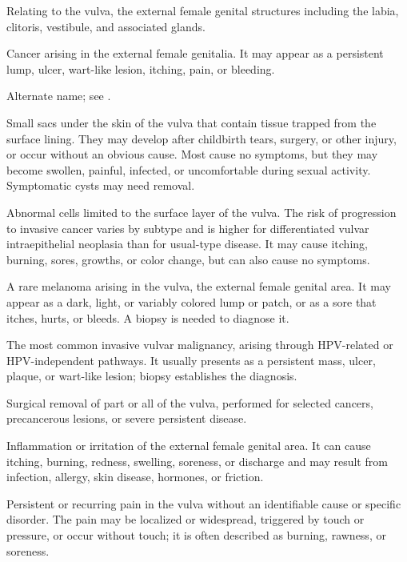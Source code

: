  Relating to the vulva, the external female genital structures including the labia, clitoris, vestibule, and associated glands.

 Cancer arising in the external female genitalia. It may appear as a persistent lump, ulcer, wart-like lesion, itching, pain, or bleeding.

 Alternate name; see .

 Small sacs under the skin of the vulva that contain tissue trapped from the surface lining. They may develop after childbirth tears, surgery, or other injury, or occur without an obvious cause. Most cause no symptoms, but they may become swollen, painful, infected, or uncomfortable during sexual activity. Symptomatic cysts may need removal.

 Abnormal cells limited to the surface layer of the vulva. The risk of progression to invasive cancer varies by subtype and is higher for differentiated vulvar intraepithelial neoplasia than for usual-type disease. It may cause itching, burning, sores, growths, or color change, but can also cause no symptoms.

 A rare melanoma arising in the vulva, the external female genital area. It may appear as a dark, light, or variably colored lump or patch, or as a sore that itches, hurts, or bleeds. A biopsy is needed to diagnose it.

 The most common invasive vulvar malignancy, arising through HPV-related or HPV-independent pathways. It usually presents as a persistent mass, ulcer, plaque, or wart-like lesion; biopsy establishes the diagnosis.

 Surgical removal of part or all of the vulva, performed for selected cancers, precancerous lesions, or severe persistent disease.

 Inflammation or irritation of the external female genital area. It can cause itching, burning, redness, swelling, soreness, or discharge and may result from infection, allergy, skin disease, hormones, or friction.

 Persistent or recurring pain in the vulva without an identifiable cause or specific disorder. The pain may be localized or widespread, triggered by touch or pressure, or occur without touch; it is often described as burning, rawness, or soreness.

